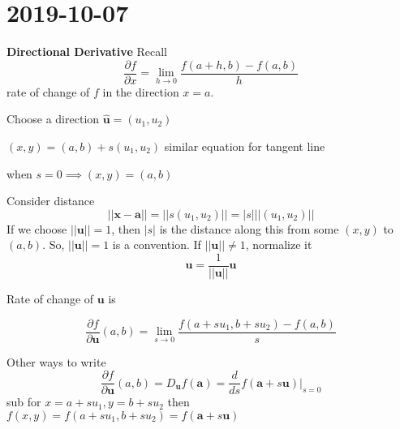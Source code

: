 \section{2019-10-07}
\textbf{Directional Derivative}
Recall
\[ \frac{\partial f}{\partial x} =\lim\limits_{{h} \to {0}} 
\frac{f(a+h,b)-f(a,b)}{h} \]
rate of change of $ f $ in the direction $ x=a $.

Choose a direction $ \bm{\hat{u}}=(u_1,u_2) $
\begin{figure}[ht]
    \centering
    
\end{figure}

$ (x,y)=(a,b)+s(u_1,u_2) $
similar equation for tangent line

when
$ s=0\implies (x,y)=(a,b) $

Consider distance 
\[ ||\bm{x}-\bm{a}||
=||s(u_1,u_2)||=|s|||(u_1,u_2)|| \]
If we choose $ ||\bm{u}||=1 $, then $ |s| $ is the
distance along this from some $ (x,y) $ to
$ (a,b) $.
So, $ ||\bm{u}||=1 $ is a convention.
If $ ||\bm{u}||\neq 1 $, normalize it
\[ \bm{u}=\frac{1}{||\bm{u}||}\bm{u} \]

\begin{thmbox}
    Rate of change of $\bm{u}$ is

    \[ \frac{\partial f}{\partial \bm{u}}(a,b) =
    \lim\limits_{{s} \to {0}}
    \frac{f(a+su_1,b+su_2)-f(a,b)}{s} \]

\end{thmbox}

Other ways to write
\[ \frac{\partial f}{\partial \bm{u}}(a,b) = 
D_{\bm{u}}f(\bm{a})=\frac{d}{ds}f(\bm{a}+s
\bm{u})\Bigr\rvert_{s=0} \]
sub for $ x=a+su_1, y=b+su_2 $
then $ f(x,y) =f(a+su_1,b+su_2)=f(\bm{a}+s\bm{u})$